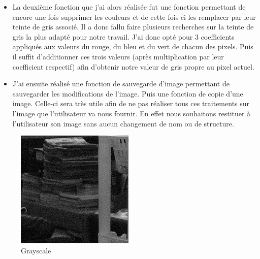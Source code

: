 \documentclass[12pt]{report}
\begin{document}
\newpage
\begin{itemize}[label=\textbullet]
	\item La deuxième fonction que j’ai alors réalisée fut une fonction permettant de encore une fois supprimer les couleurs et de cette fois ci les remplacer par leur teinte de gris associé. Il a donc fallu faire plusieurs recherches sur la teinte de gris la plus adapté pour notre travail. J’ai donc opté pour 3 coefficients appliqués aux valeurs du rouge, du bleu et du vert de chacun des pixels. Puis il suffit d’additionner ces trois valeurs (après multiplication par leur coefficient respectif) afin d’obtenir notre valeur de gris propre au pixel actuel. 
	\item J’ai ensuite réalisé une fonction de sauvegarde d’image permettant de sauvegarder les modifications de l’image. Puis une fonction de copie d’une image. Celle-ci sera très utile afin de ne pas réaliser tous ces traitements sur l’image que l’utilisateur va nous fournir. En effet nous souhaitons restituer à l’utilisateur son image sans aucun changement de nom ou de structure. 
\end{itemize}
\begin{figure}[H]
    \centering
    \includegraphics[width=0.5\textwidth]{grayscale}
    \caption{Grayscale}
\end{figure}
\end{document}
